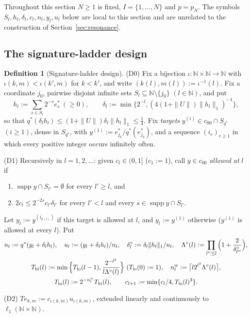 \documentclass[10pt]{amsart}
\theoremstyle{definition}
\newtheorem{definition}[theorem]{Definition}
\theoremstyle{remark}
\newcommand{\supp}{\operatorname{supp}}
\newcommand{\N}{\mathbb N}
\begin{document}
Throughout this section $N\ge1$ is fixed, $I=\{1,\dots,N\}$ and $p=p_N$.
The symbols $S_l,h_l,\delta_l,c_l,n_l,y_l,u_l$ below are local to this
section and are unrelated to the construction of
Section~\ref{sec:resonance}.

\subsection{The signature-ladder design}

\begin{definition}[Signature-ladder design]\label{def:SLD}
\textup{(D0)} Fix a bijection $\iota:\N\times\N\to\N$ with
$\iota(k,m)<\iota(k',m)$ for $k<k'$, and write $(k(l),m(l)):=\iota^{-1}(l)$.
Fix a coordinate $j_0$, pairwise disjoint infinite sets
$S_l\subseteq\N\setminus\{j_0\}$ $(l\in\N)$, and put
\[
 h_l:=\sum_{s\in S_l}2^{-s}e_s^*\ (\ge0),\qquad \delta_l:=\min\big\{2^{-l},
 (4(1+\|U\|)\|h_l\|_1)^{-1}\big\},
\]
so that $q^*(\delta_lh_l)\le(1+\|U\|)\delta_l\|h_l\|_1\le\frac14$.  Fix
\emph{targets} $y^{(i)}\in c_{00}\cap S_{q^*}$ $(i\ge1)$, dense in
$S_{q^*}$, with $y^{(1)}:=e_{j_0}^*/q^*(e_{j_0}^*)$, and a sequence
$(i_r)_{r\ge1}$ in which every positive integer occurs infinitely often.

\textup{(D1)} Recursively in $l=1,2,\dots$: given $c_l\in(0,1]$ ($c_1:=1$),
call $y\in c_{00}$ \emph{allowed at} $l$ if
\begin{enumerate}
\item[(a)] $\supp y\cap S_{l'}=\emptyset$ for every $l'\ge l$, and
\item[(b)] $2c_l\le2^{-2s}c_{l'}\delta_{l'}$ for every $l'<l$ and every
$s\in\supp y\cap S_{l'}$.
\end{enumerate}
Let $y_l:=y^{(i_{k(l)})}$ if this target is allowed at $l$, and
$y_l:=y^{(1)}$ otherwise ($y^{(1)}$ is allowed at every $l$).  Put
\begin{gather*}
 n_l:=q^*(y_l+\delta_lh_l),\quad u_l:=(y_l+\delta_lh_l)/n_l,\quad
 \delta^\circ_l:=\delta_l\|h_l\|_1/n_l,\quad
 \Lambda^\circ(l):=\prod_{l''\le l}\Big(1+\frac2{\delta^\circ_{l''}}\Big),\\
 T_{\rm hi}(l):=\min\Big\{T_{\rm lo}(l-1),\frac{2^{-l^3}}{l\Lambda^\circ(l)}
 \Big\}\ (T_{\rm lo}(0):=1),\quad n^w_l:=\big\lceil l2^{l^3}\Lambda^\circ(l)
 \big\rceil,\\
 T_{\rm lo}(l):=2^{-n^w_l}T_{\rm hi}(l),\qquad
 c_{l+1}:=\min\{c_l/4,T_{\rm lo}(l)^3\}.
\end{gather*}

\textup{(D2)} $Te_{k,m}:=c_{\iota(k,m)}u_{\iota(k,m)}$, extended linearly and
continuously to $\ell_1(\N\times\N)$.
\end{definition}
\end{document}
